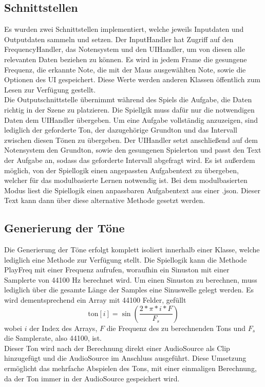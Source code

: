 \subsection*{Schnittstellen}
Es wurden zwei Schnittstellen implementiert, welche jeweils Inputdaten und Outputdaten sammeln und setzen. Der InputHandler hat Zugriff auf den FrequencyHandler, das Notensystem und den UIHandler, um von diesen alle relevanten Daten beziehen zu können. Es wird in jedem Frame die gesungene Frequenz, die erkannte Note, die mit der Maus ausgewählten Note, sowie die Optionen des UI gespeichert. Diese Werte werden anderen Klassen öffentlich zum Lesen zur Verfügung gestellt. \\
Die Outputschnittstelle übernimmt während des Spiels die Aufgabe, die Daten richtig in der Szene zu platzieren. Die Spiellgik muss dafür nur die notwendigen Daten dem UIHandler übergeben. Um eine Aufgabe vollständig anzuzeigen, sind lediglich der geforderte Ton, der dazugehörige Grundton und das Intervall zwischen diesen Tönen zu übergeben. Der UIHandler setzt anschließend auf dem Notensystem den Grundton, sowie den gesungenen Spielerton und passt den Text der Aufgabe an, sodass das geforderte Intervall abgefragt wird. Es ist außerdem möglich, von der Spiellogik einen angepassten Aufgabentext zu übergeben, welcher für das modulbasierte Lernen notwendig ist. Bei dem modulbasierten Modus liest die Spiellogik einen anpassbaren Aufgabentext aus einer .json. Dieser Text kann dann über diese alternative Methode gesetzt werden. 

\subsection*{Generierung der Töne}
Die Generierung der Töne erfolgt komplett isoliert innerhalb einer Klasse, welche lediglich eine Methode zur Verfügung stellt. Die Spiellogik kann die Methode PlayFreq mit einer Frequenz aufrufen, woraufhin ein Sinuston mit einer Samplerte von 44100 Hz berechnet wird. Um einen Sinuston zu berechnen, muss lediglich über die gesamte Länge der Samples eine Sinuswelle gelegt werden. Es wird dementsprechend ein Array mit 44100 Felder, gefüllt
$$\text{ton}[i] = \sin(\frac{2 * \pi * i * F}{F_s})$$ 
wobei $i$ der Index des Arrays, $F$ die Frequenz des zu berechnenden Tons und $F_s$ die Samplerate, also 44100, ist.\\
Dieser Ton wird nach der Berechnung direkt einer AudioSource als Clip hinzugefügt und die AudioSource im Anschluss ausgeführt. Diese Umsetzung ermöglicht das mehrfache Abspielen des Tons, mit einer einmaligen Berechnung, da der Ton immer in der AudioSource gespeichert wird. 

